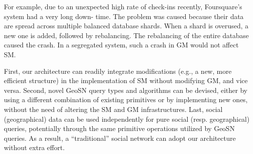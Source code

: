 For example, due to an unexpected high rate of check-ins recently, Foursquare’s system had a very long down- time. The problem was caused because their data are spread across multiple balanced database shards. When a shard is overused, a new one is added, followed by rebalancing. The rebalancing of the entire database caused the crash. In a segregated system, such a crash in GM would not affect SM.

First, our architecture can readily integrate modifications (e.g., a new, more efficient structure) in the implementation of SM without modifying GM, and vice versa. 
Second, novel GeoSN query types and algorithms can be devised, either by using a different combination of existing primitives or by implementing new ones, without the need of altering the SM and GM infrastructures. 
Last, social (geographical) data can be used independently for pure social (resp. geographical) queries, potentially through the same primitive operations utilized by GeoSN queries. 
As a result, a “traditional” social network can adopt our architecture without extra effort.

